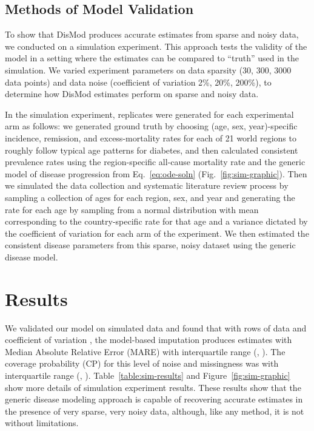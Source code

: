 \subsection{Methods of Model Validation}
To show that DisMod produces accurate estimates from
sparse and noisy data, we conducted on a simulation experiment.
This approach tests the validity of the model in a setting where the estimates can
be compared to ``truth'' used in the simulation.  We varied experiment
parameters on data sparsity (30, 300, 3000 data points) and
data noise (coefficient of variation 2\%, 20\%, 200\%), to determine how
DisMod estimates perform on sparse and noisy data.

In the simulation experiment,  replicates were
generated for each experimental arm as follows: we generated ground
truth by choosing (age, sex, year)-specific incidence, remission, and
excess-mortality rates for each of 21 world regions to roughly follow typical
age patterns for diabetes, and then calculated consistent prevalence rates using
the region-specific all-cause mortality rate and the generic model of
disease progression from Eq.~\ref{eq:ode-soln} (Fig.~\ref{fig:sim-graphic}).  Then we simulated the
data collection and systematic literature review process by sampling a
collection of ages for each region, sex, and year and generating the
rate for each age by sampling from a normal distribution with mean
corresponding to the country-specific rate for that age and a variance
dictated by the coefficient of variation for each arm of the experiment.
We then estimated the consistent disease parameters
from this sparse, noisy dataset using the generic disease model.


\section{Results}
We validated our model on simulated data and found that with
 rows of data and coefficient of variation
, the model-based imputation produces estimates with
Median Absolute Relative Error (MARE)  with
interquartile range (, ).  The coverage
probability (CP) for this level of noise and missingness was
 with interquartile range (,
).  Table~\ref{table:sim-results} and Figure~\ref{fig:sim-graphic} show more details
of simulation experiment results.  These results show that the generic
disease modeling approach is capable of recovering accurate estimates
in the presence of very sparse, very noisy data, although, like any
method, it is not without limitations.


